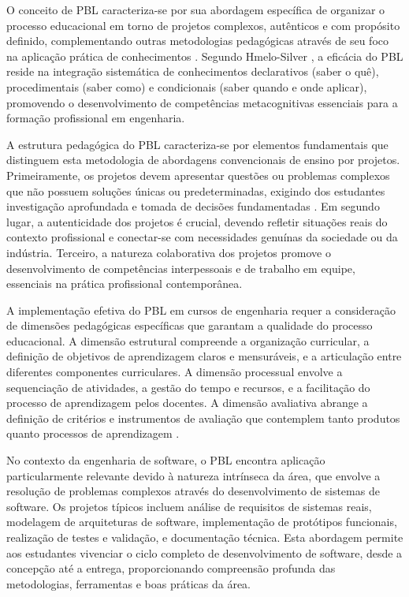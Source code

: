 \documentclass[12pt, a4paper, oneside, brazilian]{abntex2}
\begin{document}
O conceito de PBL caracteriza-se por sua abordagem específica de organizar o processo educacional em torno de projetos complexos, autênticos e com propósito definido, complementando outras metodologias pedagógicas através de seu foco na aplicação prática de conhecimentos \cite{duch2001}. Segundo Hmelo-Silver \cite{hmelo2004}, a eficácia do PBL reside na integração sistemática de conhecimentos declarativos (saber o quê), procedimentais (saber como) e condicionais (saber quando e onde aplicar), promovendo o desenvolvimento de competências metacognitivas essenciais para a formação profissional em engenharia.

A estrutura pedagógica do PBL caracteriza-se por elementos fundamentais que distinguem esta metodologia de abordagens convencionais de ensino por projetos. Primeiramente, os projetos devem apresentar questões ou problemas complexos que não possuem soluções únicas ou predeterminadas, exigindo dos estudantes investigação aprofundada e tomada de decisões fundamentadas \cite{savery2015}. Em segundo lugar, a autenticidade dos projetos é crucial, devendo refletir situações reais do contexto profissional e conectar-se com necessidades genuínas da sociedade ou da indústria. Terceiro, a natureza colaborativa dos projetos promove o desenvolvimento de competências interpessoais e de trabalho em equipe, essenciais na prática profissional contemporânea.

A implementação efetiva do PBL em cursos de engenharia requer a consideração de dimensões pedagógicas específicas que garantam a qualidade do processo educacional. A dimensão estrutural compreende a organização curricular, a definição de objetivos de aprendizagem claros e mensuráveis, e a articulação entre diferentes componentes curriculares. A dimensão processual envolve a sequenciação de atividades, a gestão do tempo e recursos, e a facilitação do processo de aprendizagem pelos docentes. A dimensão avaliativa abrange a definição de critérios e instrumentos de avaliação que contemplem tanto produtos quanto processos de aprendizagem \cite{thomas2000}.

No contexto da engenharia de software, o PBL encontra aplicação particularmente relevante devido à natureza intrínseca da área, que envolve a resolução de problemas complexos através do desenvolvimento de sistemas de software. Os projetos típicos incluem análise de requisitos de sistemas reais, modelagem de arquiteturas de software, implementação de protótipos funcionais, realização de testes e validação, e documentação técnica. Esta abordagem permite aos estudantes vivenciar o ciclo completo de desenvolvimento de software, desde a concepção até a entrega, proporcionando compreensão profunda das metodologias, ferramentas e boas práticas da área.
\end{document}
